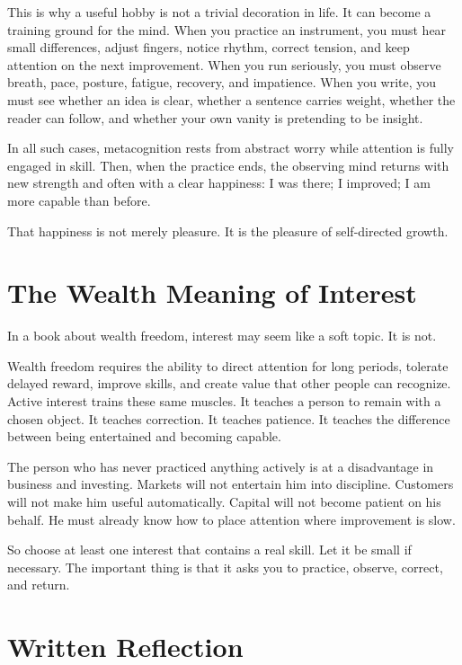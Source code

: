 This is why a useful hobby is not a trivial decoration in life. It can become a training ground for the mind. When you practice an instrument, you must hear small differences, adjust fingers, notice rhythm, correct tension, and keep attention on the next improvement. When you run seriously, you must observe breath, pace, posture, fatigue, recovery, and impatience. When you write, you must see whether an idea is clear, whether a sentence carries weight, whether the reader can follow, and whether your own vanity is pretending to be insight.

In all such cases, metacognition rests from abstract worry while attention is fully engaged in skill. Then, when the practice ends, the observing mind returns with new strength and often with a clear happiness: I was there; I improved; I am more capable than before.

That happiness is not merely pleasure. It is the pleasure of self-directed growth.

\section*{The Wealth Meaning of Interest}

In a book about wealth freedom, interest may seem like a soft topic. It is not.

Wealth freedom requires the ability to direct attention for long periods, tolerate delayed reward, improve skills, and create value that other people can recognize. Active interest trains these same muscles. It teaches a person to remain with a chosen object. It teaches correction. It teaches patience. It teaches the difference between being entertained and becoming capable.

The person who has never practiced anything actively is at a disadvantage in business and investing. Markets will not entertain him into discipline. Customers will not make him useful automatically. Capital will not become patient on his behalf. He must already know how to place attention where improvement is slow.

So choose at least one interest that contains a real skill. Let it be small if necessary. The important thing is that it asks you to practice, observe, correct, and return.

\section*{Written Reflection}

